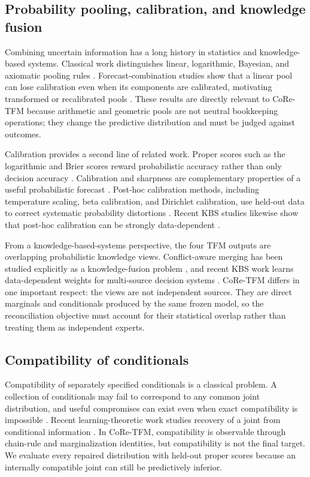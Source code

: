 \documentclass[a4paper,fleqn]{cas-sc}
\begin{document}
\subsection{Probability pooling, calibration, and knowledge fusion}
Combining uncertain information has a long history in statistics and knowledge-based systems. Classical work distinguishes linear, logarithmic, Bayesian, and axiomatic pooling rules \citep{genest1986combining,heskes1997opinion}. Forecast-combination studies show that a linear pool can lose calibration even when its components are calibrated, motivating transformed or recalibrated pools \citep{ranjan2010combining,gneiting2013combining}. These results are directly relevant to CoRe-TFM because arithmetic and geometric pools are not neutral bookkeeping operations; they change the predictive distribution and must be judged against outcomes.

Calibration provides a second line of related work. Proper scores such as the logarithmic and Brier scores reward probabilistic accuracy rather than only decision accuracy \citep{brier1950,gneiting2007strictly}. Calibration and sharpness are complementary properties of a useful probabilistic forecast \citep{gneiting2007calibration}. Post-hoc calibration methods, including temperature scaling, beta calibration, and Dirichlet calibration, use held-out data to correct systematic probability distortions \citep{guo2017calibration,kull2017beta,kull2019dirichlet}. Recent KBS studies likewise show that post-hoc calibration can be strongly data-dependent \citep{shaker2025rfcalibration}.

From a knowledge-based-systems perspective, the four TFM outputs are overlapping probabilistic knowledge views. Conflict-aware merging has been studied explicitly as a knowledge-fusion problem \citep{hunter2006merging}, and recent KBS work learns data-dependent weights for multi-source decision systems \citep{zhang2025dynamicfusion}. CoRe-TFM differs in one important respect: the views are not independent sources. They are direct marginals and conditionals produced by the same frozen model, so the reconciliation objective must account for their statistical overlap rather than treating them as independent experts.

\subsection{Compatibility of conditionals}
Compatibility of separately specified conditionals is a classical problem. A collection of conditionals may fail to correspond to any common joint distribution, and useful compromises can exist even when exact compatibility is impossible \citep{mure2019compromise}. Recent learning-theoretic work studies recovery of a joint from conditional information \citep{majid2025consistent}. In CoRe-TFM, compatibility is observable through chain-rule and marginalization identities, but compatibility is not the final target. We evaluate every repaired distribution with held-out proper scores because an internally compatible joint can still be predictively inferior.
\end{document}

